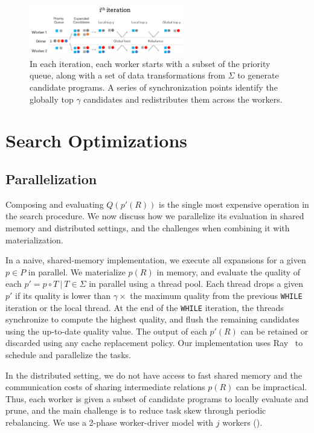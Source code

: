 \begin{figure}
    \centering
    \includegraphics[width=0.6\textwidth]{figures/distributed.pdf}
    \caption{In each iteration, each worker starts with a subset of the priority queue, along with a set of data transformations from $\Sigma$ to generate candidate programs.  A series of synchronization points identify the globally top $\gamma$ candidates and redistributes them across the workers.   \label{fig:algo}}
\end{figure}

\section{Search Optimizations}\label{s:opts}

\subsection{Parallelization}\label{s:parallel}
Composing and evaluating $Q(p'(R))$ is the single most expensive operation in the search procedure.   We now discuss how we parallelize its evaluation in shared memory and distributed settings, and the challenges when combining it with materialization.

In a naive, shared-memory implementation, we execute all expansions for a given $p\in P$ in parallel.  We materialize $p(R)$ in memory, and evaluate the quality of each $p' = p\circ T\ |\ T \in \Sigma$ in parallel using a  thread pool.  Each thread drops a given $p'$ if its quality is lower than $\gamma\times$ the maximum quality from the previous \texttt{WHILE} iteration or the local thread.  At the end of the \texttt{WHILE} iteration, the threads synchronize to compute the highest quality, and flush the remaining candidates using the up-to-date quality value.  The output of each $p'(R)$ can be retained or discarded using any cache replacement policy.  Our implementation uses Ray~\cite{ray} to schedule and parallelize the tasks.

In the distributed setting, we do not have access to fast shared memory and the communication costs of sharing intermediate relations $p(R)$ can be impractical.  Thus, each worker is given a subset of candidate programs to locally evaluate and prune, and the main challenge is to reduce task skew through periodic rebalancing.  We use a 2-phase worker-driver model with $j$ workers ().


